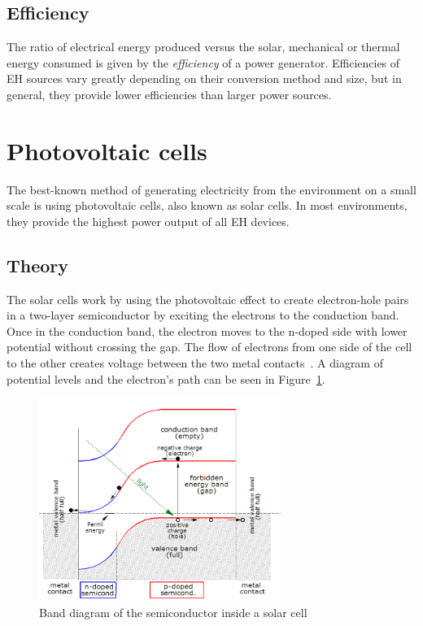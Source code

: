 \documentclass[a4paper,10pt]{article}
\begin{document}
\subsection{Efficiency}


The ratio of electrical energy produced versus the solar, mechanical or thermal energy consumed is given by the {\em efficiency} of a power generator. Efficiencies of \ac{EH} sources vary greatly depending on their conversion method and size, but in general, they provide lower efficiencies than larger power sources. 

\section{Photovoltaic cells}

The best-known method of generating electricity from the environment on a small scale is using photovoltaic cells, also known as solar cells. In most environments, they provide the highest power output of all \ac{EH} devices. 

\subsection{Theory}

The solar cells work by using the photovoltaic effect to create electron-hole pairs in a two-layer semiconductor by exciting the electrons to the conduction band. Once in the conduction band, the electron moves to the n-doped side with lower potential without crossing the gap. The flow of electrons from one side of the cell to the other creates voltage between the two metal contacts~\cite{wiki:solar-cells}. A diagram of potential levels and the electron's path can be seen in Figure~\ref{fig:pv-band-diagram}. 

\begin{figure}[!h]
\centering
\includegraphics[width=0.7\textwidth]{./Slike/PV-band-diagram}
 \caption{Band diagram of the semiconductor inside a solar cell~\cite{wiki:solar-cells}}
\label{fig:pv-band-diagram}
\end{figure}
\end{document}
